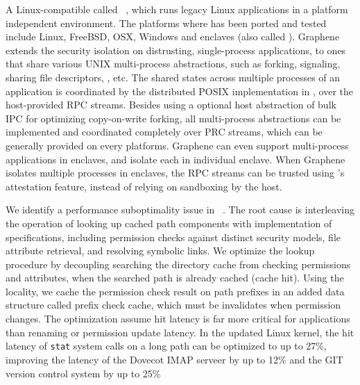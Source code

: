 \begin{compactitem}

\item A Linux-compatible \libos{} called \term{\graphene{}}~\citep{tsai14graphene},
which runs legacy Linux applications in a platform independent environment.
The platforms where \graphene{} has been ported and tested
include Linux, FreeBSD, OSX,
Windows and \intel{} \sgx{} enclaves (also called \term{\graphenesgx{}}).
Graphene extends the security isolation on distrusting, single-process applications,
to ones that share various UNIX multi-process abstractions,
such as forking, signaling, sharing file descriptors, \sysvipc{}, etc.
The shared states across multiple processes of an application
is coordinated by the distributed POSIX implementation in \graphene{},
over the host-provided RPC streams.
Besides using a optional host abstraction of bulk IPC for optimizing copy-on-write forking,
all multi-process abstractions can be
implemented and coordinated completely over PRC streams,
which can be generally provided on every platforms.
Graphene can even support multi-process applications in \intel{} \sgx{} enclaves,
and isolate each \picoproc{} in individual enclave.
When Graphene isolates multiple processes in enclaves,
the RPC streams can be trusted using \intel{} \sgx{}'s attestation feature,
instead of relying on sandboxing by the host.


\item
We identify a performance suboptimality issue in 
~\citep{tsai15dcache}.
The root cause is
interleaving the operation of looking up cached path components
with implementation of specifications,
including permission checks against distinct security models,
file attribute retrieval,
and resolving symbolic links.
We optimize the lookup procedure by decoupling searching the directory cache
from checking permissions and attributes,
when the searched path is already cached (cache hit).
Using the locality,
we cache the permission check result on path prefixes in an added data structure
called prefix check cache,
which must be invalidates when permission changes.
The optimization assume hit latency is far more critical for applications
than renaming or permission update latency.
In the updated Linux kernel,
the hit latency of {\tt stat} system calls on a long path
can be optimized to up to 27\%,
improving the latency of
the Dovecot IMAP serveer by up to 12\%
and the GIT version control system by up to 25\%



\end{compactitem}
